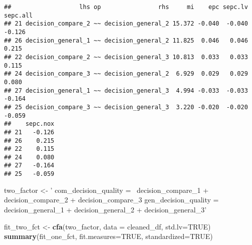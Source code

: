 \documentclass[]{article}
\newenvironment{Shaded}{\begin{snugshade}}{\end{snugshade}}
\newcommand{\DataTypeTok}[1]{\textcolor[rgb]{0.13,0.29,0.53}{#1}}
\newcommand{\KeywordTok}[1]{\textcolor[rgb]{0.13,0.29,0.53}{\textbf{#1}}}
\newcommand{\NormalTok}[1]{#1}
\newcommand{\OtherTok}[1]{\textcolor[rgb]{0.56,0.35,0.01}{#1}}
\newcommand{\StringTok}[1]{\textcolor[rgb]{0.31,0.60,0.02}{#1}}
\begin{document}
\begin{verbatim}
##                   lhs op                rhs     mi    epc sepc.lv sepc.all
## 21 decision_compare_2 ~~ decision_general_2 15.372 -0.040  -0.040   -0.126
## 26 decision_general_1 ~~ decision_general_2 11.825  0.046   0.046    0.215
## 22 decision_compare_2 ~~ decision_general_3 10.813  0.033   0.033    0.115
## 24 decision_compare_3 ~~ decision_general_2  6.929  0.029   0.029    0.080
## 27 decision_general_1 ~~ decision_general_3  4.994 -0.033  -0.033   -0.164
## 25 decision_compare_3 ~~ decision_general_3  3.220 -0.020  -0.020   -0.059
##    sepc.nox
## 21   -0.126
## 26    0.215
## 22    0.115
## 24    0.080
## 27   -0.164
## 25   -0.059
\end{verbatim}

\begin{Shaded}
\begin{Highlighting}[]
\NormalTok{two_factor <-}\StringTok{ '}
\StringTok{com_decision_quality =~ decision_compare_1 + }
\StringTok{                    decision_compare_2 + }
\StringTok{                    decision_compare_3}
\StringTok{                    }
\StringTok{gen_decision_quality =~ decision_general_1 + }
\StringTok{                    decision_general_2 + }
\StringTok{                    decision_general_3'}

\NormalTok{fit_two_fct <-}\StringTok{ }\KeywordTok{cfa}\NormalTok{(two_factor, }\DataTypeTok{data =}\NormalTok{ cleaned_df, }\DataTypeTok{std.lv=}\OtherTok{TRUE}\NormalTok{)}
\KeywordTok{summary}\NormalTok{(fit_one_fct, }\DataTypeTok{fit.measures=}\OtherTok{TRUE}\NormalTok{, }\DataTypeTok{standardized=}\OtherTok{TRUE}\NormalTok{)}
\end{Highlighting}
\end{Shaded}
\end{document}
